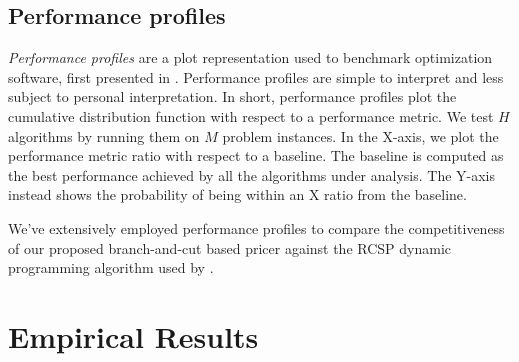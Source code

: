 \subsection{Performance profiles}
\label{sec:results-performance-profiles}

\textit{Performance profiles} are a plot representation used to benchmark optimization software,
first presented in \textcite{dolan2002}.
Performance profiles are simple to interpret and less subject to personal interpretation.
In short, performance profiles plot the cumulative distribution function with respect to a performance metric.
We test $H$ algorithms by running them on $M$ problem instances.
In the X-axis, we plot the performance metric ratio with respect to a baseline.
The baseline is computed as the best performance achieved by all the algorithms under analysis.
The Y-axis instead shows the probability of being within an X ratio from the baseline.

\medskip

We've extensively employed performance profiles to compare the competitiveness of
our proposed branch-and-cut based pricer
against the RCSP dynamic programming algorithm used by \bapcod{} \parencite{pessoa2020generic}.

\begin{comment}
In this thesis, we will use performance profiles extensively to measure each solver by exploiting two performance metrics: \textbf{Time metric}, \textbf{Cost metric}.

A \textbf{Time performance profile} will tell us which resolution method is the fastest in terms of runtime.
A \textbf{Cost performance profile}, instead, will show us the cost ratio of the best upper bound obtained from each resolution method.
The ground truth optimal, as extracted from the dataset, is used instead as the cost baseline.
\end{comment}

\section{Empirical Results}
\label{sec:results-empirical-results}




